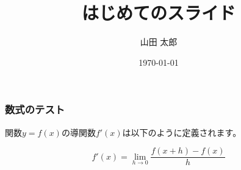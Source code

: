 \documentclass{beamer}
\title{はじめてのスライド}
\author{山田 太郎}
\institute{羅手府大学}
\date{\today}
\begin{document}
\maketitle
\begin{frame}
\frametitle{数式のテスト}
関数$y=f(x)$の導関数$f'(x)$は以下のように定義されます。

\[ f'(x) = \lim_{h\to 0} \frac{f(x+h)-f(x)}{h} \]
\end{frame}
\end{document}
